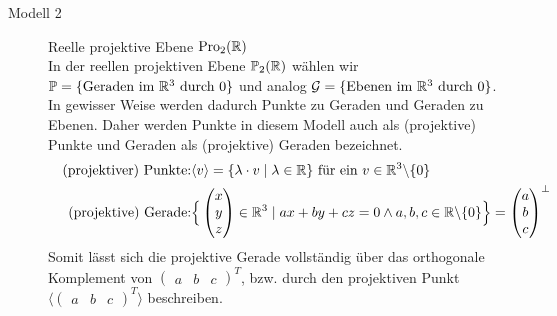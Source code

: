 \begin{description}
      \item[Modell 2] Reelle projektive Ebene $\operatorname{Pro}_2(\mathbb R)$ \label{Desargues-ReelleProjektiveEbene} \\
          In der reellen projektiven Ebene $\mathbb{P}_2(\mathbb R)$ wählen wir 
          $\mathbb{P} = \{ \mbox{Geraden im $\mathbb R^3$ durch $0$} \}$ und analog 
          $\mathcal{G} = \{ \mbox{Ebenen im $\mathbb R^3$ durch $0$} \}$. In gewisser Weise werden dadurch 
          Punkte zu Geraden und Geraden zu Ebenen. Daher werden Punkte in diesem Modell auch als
          (projektive) Punkte und Geraden als (projektive) Geraden bezeichnet.
          \begin{align*}
              &&\text{(projektiver) Punkte:} &
                  \langle v \rangle = \{ \lambda \cdot v \mid \lambda \in \mathbb R \} \text{ für ein } v\in \mathbb R^3 \backslash \{ 0 \} \\
              &&\text{(projektive) Gerade:} & 
                  \Big\{ \begin{pmatrix} x \\ y \\ z\end{pmatrix} \in \mathbb R^3 
                  \mid ax + by + cz = 0 \wedge a,b,c \in \mathbb R\backslash \{0\} \Big\} = 
                  \begin{pmatrix} a \\ b \\ c\end{pmatrix}^\perp
          \end{align*}
          Somit lässt sich die projektive Gerade vollständig über das orthogonale Komplement 
          von $\begin{pmatrix} a & b & c\end{pmatrix}^T$, bzw. durch den projektiven Punkt 
          $\langle \begin{pmatrix} a & b & c\end{pmatrix}^T \rangle$ beschreiben.
  \end{description}

    

